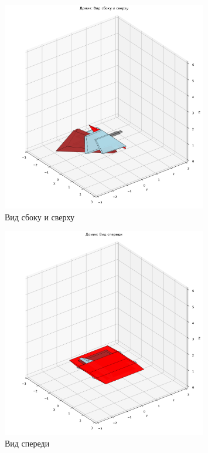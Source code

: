 \begin{figure}[H]
\centering
\includegraphics[width=0.8\textwidth]{images/task8/house_side_top.png}
\caption{Вид сбоку и сверху}
\end{figure}

\begin{figure}[H]
\centering
\includegraphics[width=0.8\textwidth]{images/task8/house_front.png}
\caption{Вид спереди}
\end{figure}

